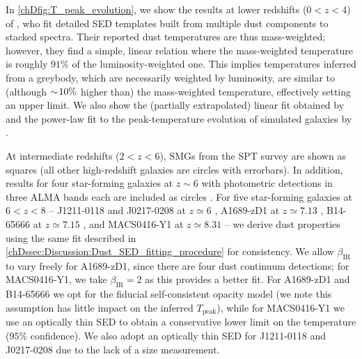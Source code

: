 In \cref{chDfig:T_peak_evolution}, we show the results at lower redshifts ($0 < z < 4$) of \citet{2018A&A...609A..30S}, who fit detailed SED templates built from multiple dust components to stacked spectra. Their reported dust temperatures are thus mass-weighted; however, they find a simple, linear relation where the mass-weighted temperature is roughly $91\%$ of the luminosity-weighted one. This implies temperatures inferred from a greybody, which are necessarily weighted by luminosity, are similar to (although $\sim \! 10\%$ higher than) the mass-weighted temperature, effectively setting an upper limit. We also show the (partially extrapolated) linear fit obtained by \citet{2018A&A...609A..30S} and the power-law fit to the peak-temperature evolution of simulated galaxies by \citet{2019MNRAS.489.1397L}.

At intermediate redshifts ($2 < z < 6$), SMGs from the SPT survey \citep{2020ApJ...902...78R} are shown as squares (all other high-redshift galaxies are circles with errorbars). In addition, results for four star-forming galaxies at $z \sim 6$ with photometric detections in three ALMA bands each are included as circles \citep{2020MNRAS.498.4192F}. For five star-forming galaxies at $6 < z < 8$ -- J1211-0118 and J0217-0208 at $z \simeq 6$ \citep{2020ApJ...896...93H}, A1689-zD1 at $z \simeq 7.13$ \citep{2017MNRAS.466..138K, 2020MNRAS.495.1577I, 2021MNRAS.508L..58B}, B14-65666 at $z \simeq 7.15$ \citep{2019PASJ...71...71H, 2021ApJ...923....5S}, and MACS0416-Y1 at $z \simeq 8.31$ \citep{2019ApJ...874...27T, 2020MNRAS.493.4294B} -- we derive dust properties using the same  fit described in \cref{chDssec:Discussion:Dust_SED_fitting_procedure} for consistency. We allow $\beta_\text{IR}$ to vary freely for A1689-zD1, since there are four dust continuum detections; for MACS0416-Y1, we take $\beta_\text{IR} = 2$ as this provides a better fit. For A1689-zD1 and B14-65666 we opt for the fiducial self-consistent opacity model (we note this assumption has little impact on the inferred $T_\text{peak}$), while for MACS0416-Y1 we use an optically thin SED to obtain a conservative lower limit on the temperature ($95 \%$ confidence). We also adopt an optically thin SED for J1211-0118 and J0217-0208 due to the lack of a size measurement.

